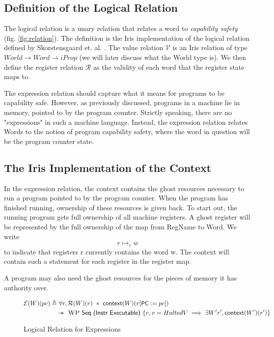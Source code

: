 \documentclass[sigplan,review,anonymous]{acmart}\settopmatter{printfolios=true,printccs=false,printacmref=false}
\newcommand{\sep}{-\kern-.6em\raisebox{-.659ex}{*}\ }
\newcommand{\interp}[2]{(#1)(#2)}
\begin{document}
\subsection{Definition of the Logical Relation}
The logical relation is a unary relation that relates a word to  \textit{capability safety} (fig. \ref{fig:relation}). The definition is the Iris implementation of the logical relation defined by Skorstensgaard et. al. \cite{skorstensgaard}. The value relation $\mathcal{V}$ is an Iris relation of type $World \to Word \to iProp$ (we will later discuss what the World type is). We then define the register relation $\mathcal{R}$ as the validity of each word that the register state maps to. 

The expression relation should capture what it means for programs to be capability safe. However, as previously discussed, programs in a machine lie in memory, pointed to by the program counter. Strictly speaking, there are no "expressions" in such a machine language. Instead, the expression relation relates Words to the notion of program capability safety, where the word in question will be the program counter state.

\subsection{The Iris Implementation of the Context}
In the expression relation, the \textsf{context} contains the ghost resources necessary to run a program pointed to by the program counter. When the program has finished running, ownership of these resources is given back. To start out, the running program gets full ownership of all machine registers. A ghost register will be represented by the full ownership of the map from RegName to Word. We write 
$$ r \mapsto_r w$$
to indicate that registers r currently contains the word w. The context will contain such a statement for each register in the register map. 

A program may also need the ghost resources for the pieces of memory it has authority over. 

\begin{figure*}[ht]
	\begin{minipage}{\textwidth}
	\begin{align*}
		\mathcal{E}\interp{W}{pc} \triangleq&~\forall r, \mathcal{R}(W)(r) ~*~\textsf{context}(W)(r[\textsf{\small PC}:=pc])\\
		&\sep~\textsc{WP}~\textsf{Seq (Instr Executable)}~\{ v, v = HaltedV \implies \exists W' r', \textsf{context}(W')(r')\}
	\end{align*}
	\end{minipage}
	\label{fig:expr}
	\caption{Logical Relation for Expressions}
\end{figure*}
\end{document}
